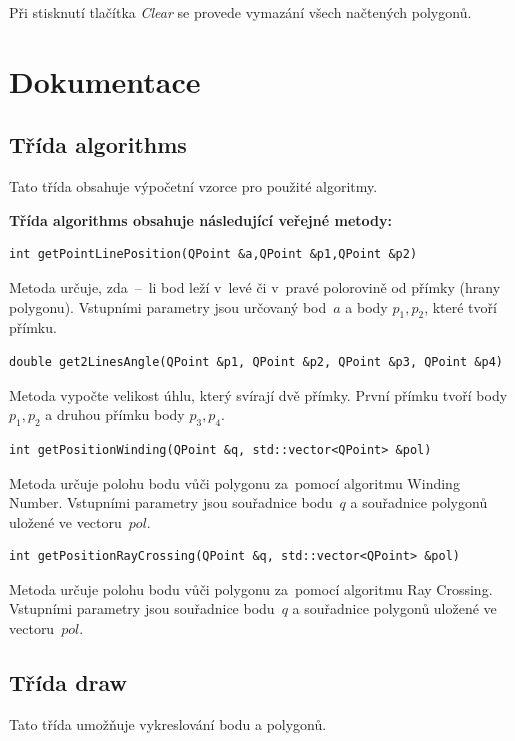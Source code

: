 \documentclass[a4paper, 12pt, oneside, titlepage]{article} %
\begin{document}
Při stisknutí tlačítka \emph{Clear} se provede vymazání všech načtených polygonů.

\section{Dokumentace}
\subsection{Třída algorithms}
Tato třída obsahuje výpočetní vzorce pro použité algoritmy.

\textbf{Třída algorithms obsahuje následující veřejné metody:}
\begin{verbatim}
int getPointLinePosition(QPoint &a,QPoint &p1,QPoint &p2)
\end{verbatim}
Metoda určuje, zda~--~li bod leží v~levé či v~pravé polorovině od přímky (hrany polygonu). Vstupními parametry jsou určovaný bod~$a$ a body $p_1, p_2$, které tvoří přímku.\\

\begin{verbatim}
double get2LinesAngle(QPoint &p1, QPoint &p2, QPoint &p3, QPoint &p4)
\end{verbatim}
Metoda vypočte velikost úhlu, který svírají dvě přímky. První přímku tvoří body $p_1, p_2$ a druhou přímku body $p_3, p_4$.\\

\begin{verbatim}
int getPositionWinding(QPoint &q, std::vector<QPoint> &pol)
\end{verbatim}
Metoda určuje polohu bodu vůči polygonu za~pomocí algoritmu Winding Number. Vstupními parametry jsou souřadnice bodu~$q$ a souřadnice polygonů uložené ve vectoru~$pol$.\\

\begin{verbatim}
int getPositionRayCrossing(QPoint &q, std::vector<QPoint> &pol)
\end{verbatim}
Metoda určuje polohu bodu vůči polygonu za~pomocí algoritmu Ray Crossing. Vstupními parametry jsou souřadnice bodu~$q$ a souřadnice polygonů uložené ve vectoru~$pol$.

\subsection{Třída draw}
Tato třída umožňuje vykreslování bodu a polygonů.
\end{document}
